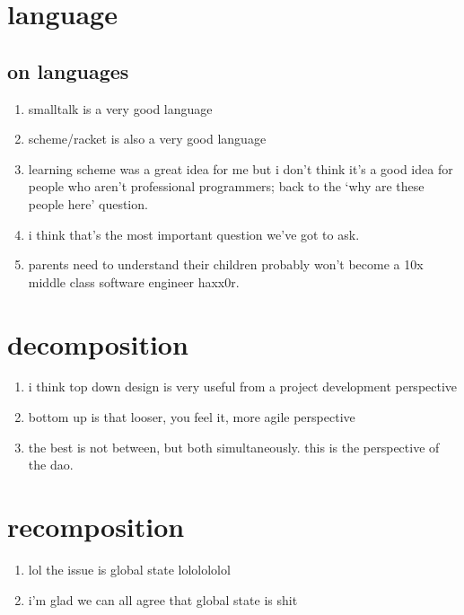 \section{language}
\subsection{on languages}
\begin{enumerate}
	\item smalltalk is a very good language
	\item scheme/racket is also a very good language
	\item learning scheme was a great idea for me but i don't think it's a good idea for people who aren't professional programmers; back to the `why are these people here' question.
	\item i think that's the most important question we've got to ask.
	\item parents need to understand their children probably won't become a 10x middle class software engineer haxx0r.
\end{enumerate}
\section{decomposition}
\begin{enumerate}
	\item i think top down design is very useful from a project development perspective
	\item bottom up is that looser, you feel it, more agile perspective
	\item the best is not between, but both simultaneously. this is the perspective of the dao.
\end{enumerate}
\section{recomposition}
\begin{enumerate}
	\item lol the issue is global state lololololol
	\item i'm glad we can all agree that global state is shit
\end{enumerate}